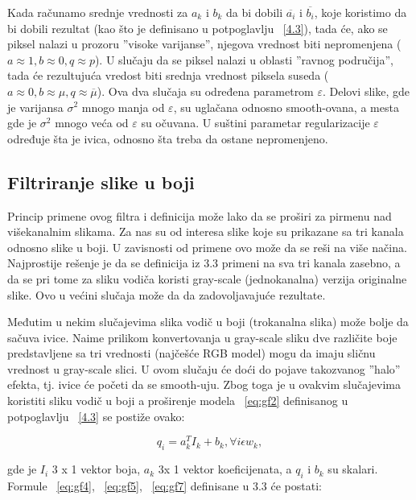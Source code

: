 \documentclass[a4paper,12pt,titlepage]{article}
\begin{document}
Kada računamo srednje vrednosti za $a_k$ i $b_k$ da bi dobili $\overline{a_i}$ i $\overline{b_i}$, koje koristimo da bi dobili rezultat (kao što je definisano u potpoglavlju ~\ref{4.3}), tada će, ako se piksel nalazi u prozoru ''visoke varijanse'', njegova vrednost biti nepromenjena ($a \approx 1, b \approx 0, q \approx p$). U slučaju da se piksel nalazi u oblasti ''ravnog područija'', tada će rezultujuća vredost biti srednja vrednost piksela suseda ($a \approx 0, b \approx \mu, q \approx \overline{\mu}$). Ova dva slučaja su određena parametrom $\varepsilon$. Delovi slike, gde je varijansa $\sigma^2$ mnogo manja od $\varepsilon$, su uglačana odnosno smooth-ovana, a mesta gde je $\sigma^2$ mnogo veća od $\varepsilon$ su očuvana. U suštini parametar regularizacije $\varepsilon$ određuje šta je ivica, odnosno šta treba da ostane nepromenjeno.   

\subsection{Filtriranje slike u boji}%

Princip primene ovog filtra i definicija može lako da se proširi za pirmenu nad višekanalnim slikama. Za nas su od interesa slike koje su prikazane sa tri kanala  odnosno slike u boji. U zavisnosti od primene ovo može da se reši na više načina. Najprostije rešenje je da se definicija iz 3.3 primeni na sva tri kanala zasebno, a da se pri tome za sliku vodiča koristi gray-scale (jednokanalna) verzija originalne slike. Ovo u većini slučaja može da da zadovoljavajuće rezultate. 

Međutim u nekim slučajevima slika vodič u boji (trokanalna slika) može bolje da sačuva ivice. Naime prilikom konvertovanja u gray-scale sliku dve različite boje predstavljene sa tri vrednosti (najčešće RGB model) mogu da imaju sličnu vrednost u gray-scale slici. U ovom slučaju će doći do pojave takozvanog ''halo'' efekta, tj. ivice će početi da se smooth-uju. Zbog toga je u ovakvim slučajevima koristiti sliku vodič u boji a proširenje modela ~\ref{eq:gf2} definisanog u potpoglavlju ~\ref{4.3} se postiže ovako:

\begin{equation}\label{gf10}
	q_i = a_k^T I_k + b_k, \forall i \epsilon w_k,
\end{equation}   

gde je $I_i$ 3 x 1 vektor boja, $a_k$ 3x 1 vektor koeficijenata, a $q_i$ i $b_k$ su skalari. Formule ~\ref{eq:gf4}, ~\ref{eq:gf5}, ~\ref{eq:gf7} definisane u 3.3 će postati:
\end{document}
